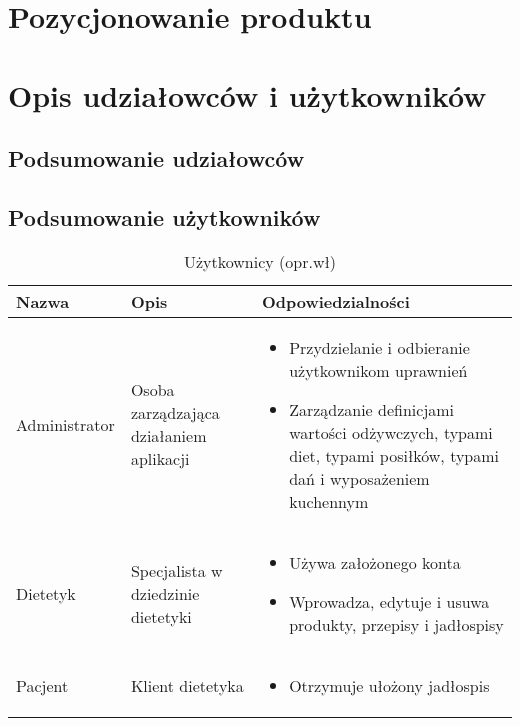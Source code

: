 \section{Pozycjonowanie produktu}

\section{Opis udziałowców i użytkowników}
\subsection{Podsumowanie udziałowców}

\subsection{Podsumowanie użytkowników}

\begin{minipage}{\textwidth}
    \begin{table}[H]
        \centering\caption{Użytkownicy (opr.wł)\label{tabela:uzytkownicy}}
        \begin{tabular}{|P{.2\textwidth}|P{.25\textwidth}|P{.45\textwidth}|}

            \hline
            Nazwa & Opis & Odpowiedzialności\\

            \hline
            Administrator &
            Osoba zarządzająca działaniem aplikacji &
            \begin{itemize}
                \item Przydzielanie i odbieranie użytkownikom uprawnień
                \item Zarządzanie definicjami wartości odżywczych, typami diet, typami posiłków, typami dań i wyposażeniem kuchennym
            \end{itemize} \\
            \hline
            Dietetyk &
            Specjalista w dziedzinie dietetyki &
            \begin{itemize}
                \item Używa założonego konta
                \item Wprowadza, edytuje i usuwa produkty, przepisy i jadłospisy
            \end{itemize} \\
            \hline
            Pacjent &
            Klient dietetyka &
            \begin{itemize}
                \item Otrzymuje ułożony jadłospis
            \end{itemize} \\
            \hline
        \end{tabular}
    \end{table}
\end{minipage}

